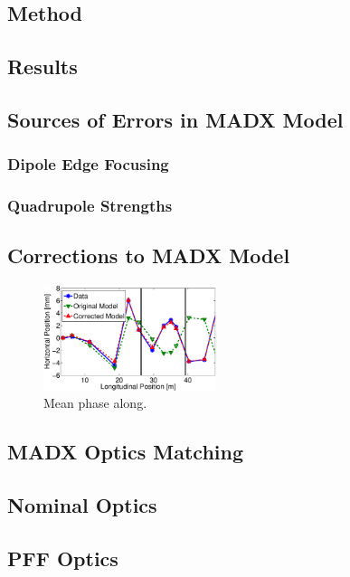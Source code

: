
\subsection{Method}
\label{ss:opticsMethod}

\subsection{Results}
\label{ss:opticsResults}

\subsection{Sources of Errors in MADX Model}
\label{ss:modelErrorSources}

\subsubsection{Dipole Edge Focusing}
\label{sss:edgeFocusing}

\subsubsection{Quadrupole Strengths}
\label{sss:quadStrengths}

\subsection{Corrections to MADX Model}
\label{ss:modelCorrections}

\begin{figure}
  \centering
  \includegraphics[width=0.45\textwidth]{Figures/opticsCorrVsOrig}
  \caption{Mean phase along.}
  \label{f:opticsCorrVsOrig}
\end{figure}


\subsection{MADX Optics Matching}
\label{ss:madxMatching}

\subsection{Nominal Optics}
\label{ss:nominalMatched}

\subsection{PFF Optics}
\label{ss:pffMatched}


